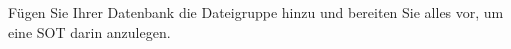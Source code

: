 \item Fügen Sie Ihrer Datenbank die Dateigruppe  hinzu
und bereiten Sie alles vor, um eine SOT darin anzulegen.
